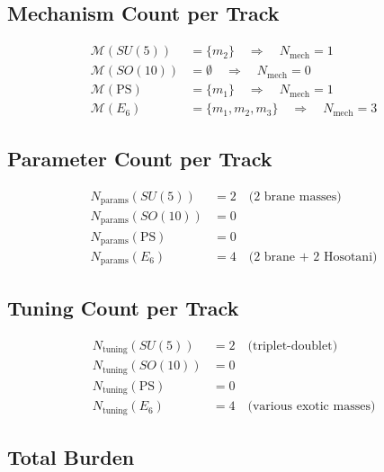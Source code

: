 \documentclass[11pt,a4paper]{article}
\begin{document}
\subsection{Mechanism Count per Track}
\label{app:mech-count}

\begin{align}
\label{eq:mech-su5}
\mathcal{M}(SU(5)) &= \{m_2\} \quad \Rightarrow \quad N_{\text{mech}} = 1 \\
\label{eq:mech-so10}
\mathcal{M}(SO(10)) &= \emptyset \quad \Rightarrow \quad N_{\text{mech}} = 0 \\
\label{eq:mech-ps}
\mathcal{M}(\text{PS}) &= \{m_1\} \quad \Rightarrow \quad N_{\text{mech}} = 1 \\
\label{eq:mech-e6}
\mathcal{M}(E_6) &= \{m_1, m_2, m_3\} \quad \Rightarrow \quad N_{\text{mech}} = 3
\end{align}

\subsection{Parameter Count per Track}
\label{app:param-count}

\begin{align}
\label{eq:param-su5}
N_{\text{params}}(SU(5)) &= 2 \quad \text{(2 brane masses)} \\
\label{eq:param-so10}
N_{\text{params}}(SO(10)) &= 0 \\
\label{eq:param-ps}
N_{\text{params}}(\text{PS}) &= 0 \\
\label{eq:param-e6}
N_{\text{params}}(E_6) &= 4 \quad \text{(2 brane + 2 Hosotani)}
\end{align}

\subsection{Tuning Count per Track}
\label{app:tuning-count}

\begin{align}
\label{eq:tuning-su5}
N_{\text{tuning}}(SU(5)) &= 2 \quad \text{(triplet-doublet)} \\
\label{eq:tuning-so10}
N_{\text{tuning}}(SO(10)) &= 0 \\
\label{eq:tuning-ps}
N_{\text{tuning}}(\text{PS}) &= 0 \\
\label{eq:tuning-e6}
N_{\text{tuning}}(E_6) &= 4 \quad \text{(various exotic masses)}
\end{align}

\subsection{Total Burden}
\label{app:total-burden}
\end{document}
